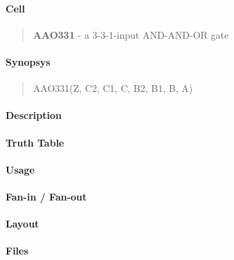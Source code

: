\label{AAO331}
\paragraph{Cell}
\begin{quote}
    \textbf{AAO331} - a 3-3-1-input AND-AND-OR gate
\end{quote}

\paragraph{Synopsys}
\begin{quote}
    AAO331(Z, C2, C1, C, B2, B1, B, A)
\end{quote}

\paragraph{Description}

%

\paragraph{Truth Table}
%

\paragraph{Usage}

\paragraph{Fan-in / Fan-out}

\paragraph{Layout}

\paragraph{Files}
